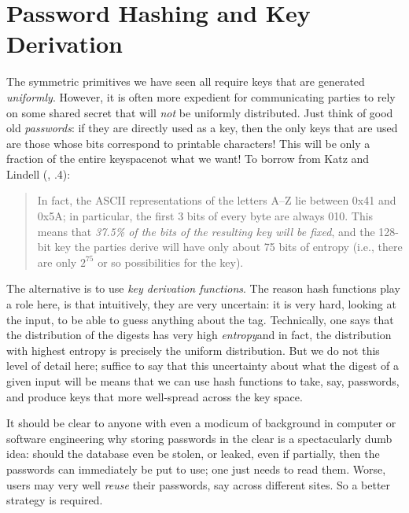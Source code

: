 \section{Password Hashing and Key Derivation}
  \label{sec:pwdhash_pbkdf}
  The symmetric primitives we have seen all require keys that are generated \emph{uniformly}. However, it is often more expedient for communicating parties to rely on some shared secret that will \emph{not} be uniformly distributed. Just think of good old \emph{passwords}: if they are directly used as a key, then the only keys that are used are those whose bits correspond to printable characters! This will be only a fraction of the entire keyspace\emd not what we want! To borrow from Katz and Lindell (\cite{KatzLindell:IMC}, .4):
  \begin{quotation}
    \noindent In fact, the ASCII representations of the letters A–Z lie between 0x41 and 0x5A; in particular, the first 3 bits of every byte are always 010. This means that \emph{37.5\% of the bits of the resulting key will be fixed}, and the 128-bit key the parties derive will have only about 75 bits of entropy (i.e., there are only $2^{75}$ or so possibilities for the key).
  \end{quotation}

  The alternative is to use \emph{key derivation functions}. The reason hash functions play a role here, is that intuitively, they are very uncertain: it is very hard, looking at the input, to be able to guess anything about the tag. Technically, one says that the distribution of the digests has very high \emph{entropy}\emd and in fact, the distribution with highest entropy is precisely the uniform distribution. But we do not this level of detail here; suffice to say that this uncertainty about what the digest of a given input will be means that we can use hash functions to take, say, passwords, and produce keys that more well-spread across the key space.

  \medskip

   It should be clear to anyone with even a modicum of background in computer or software engineering why storing passwords in the clear is a spectacularly dumb idea: should the database even be stolen, or leaked, even if partially, then the passwords can immediately be put to use; one just needs to read them. Worse, users may very well \emph{reuse} their passwords, say across different sites. So a better strategy is required.

